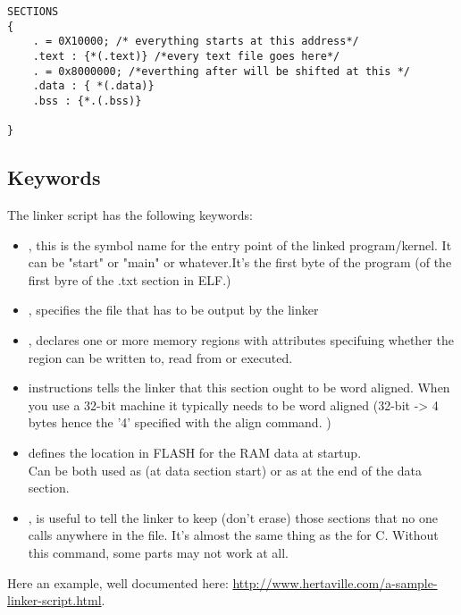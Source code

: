 \begin{lstlisting}
SECTIONS
{
	. = 0X10000; /* everything starts at this address*/
	.text : {*(.text)} /*every text file goes here*/ 
	. = 0x8000000; /*everthing after will be shifted at this */
	.data : { *(.data)}
	.bss : {*.(.bss)}

}

\end{lstlisting}

\subsection{Keywords}
The linker script has the following keywords:
\begin{itemize}
	\item {}, this is the symbol name for the entry point of the linked program/kernel. It can be "start" or "main" or whatever.It's the first byte of the program (of the first byre of the .txt section in ELF.)
	\item {}, specifies the file that has to be output by the linker
	\item {}, declares one or more memory regions with attributes specifuing whether the region can be written to, read from or executed.
	\item {} instructions tells the linker that this section ought to be word aligned. When you use a 32-bit machine it typically needs to be word aligned (32-bit -> 4 bytes hence the '4' specified with the align command. )
	\item {} defines the location in FLASH for the RAM data at startup. \\ Can be both used as  (at data section start) or as  at the end of the data section.
	\item {}, is useful to tell the linker to keep (don't erase) those sections that no one calls anywhere in the  file. It's almost the same thing as the  for C. Without this command, some parts may not work at all.
\end{itemize}

Here an example, well documented here:  \url{http://www.hertaville.com/a-sample-linker-script.html}.

